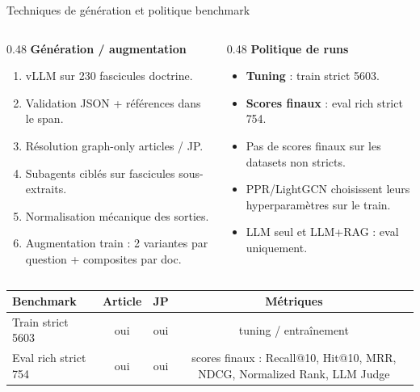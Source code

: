 \documentclass[aspectratio=169,10pt]{beamer}
\begin{document}
\begin{frame}{Techniques de génération et politique benchmark}
  \footnotesize
  \begin{columns}[T,onlytextwidth]
    \begin{column}{0.48\textwidth}
      \textbf{\color{accent}Génération / augmentation}
      \begin{enumerate}\setlength{\itemsep}{0.25em}
        \item vLLM sur 230 fascicules doctrine.
        \item Validation JSON + références dans le span.
        \item Résolution graph-only articles / JP.
        \item Subagents ciblés sur fascicules sous-extraits.
        \item Normalisation mécanique des sorties.
        \item Augmentation train :
        2 variantes par question + composites par doc.
      \end{enumerate}
    \end{column}
    \begin{column}{0.48\textwidth}
      \textbf{\color{ok}Politique de runs}
      \begin{itemize}\setlength{\itemsep}{0.35em}
        \item \textbf{Tuning} : train strict 5603.
        \item \textbf{Scores finaux} : eval rich strict 754.
        \item Pas de scores finaux sur les datasets non stricts.
        \item PPR/LightGCN choisissent leurs hyperparamètres sur le train.
        \item LLM seul et LLM+RAG : eval uniquement.
      \end{itemize}
    \end{column}
  \end{columns}

  \vspace{0.7em}
  \begin{center}
  \renewcommand{\arraystretch}{1.1}
  \setlength{\tabcolsep}{5pt}
  \begin{tabular}{@{}l c c c@{}}
    \toprule
    \textbf{Benchmark} & \textbf{Article} & \textbf{JP} & \textbf{Métriques} \\
    \midrule
    Train strict 5603 & oui & oui & tuning / entraînement \\
    Eval rich strict 754 & oui & oui & scores finaux : Recall@10, Hit@10, MRR, NDCG, Normalized Rank, LLM Judge \\
    \bottomrule
  \end{tabular}
  \end{center}
\end{frame}
\end{document}
